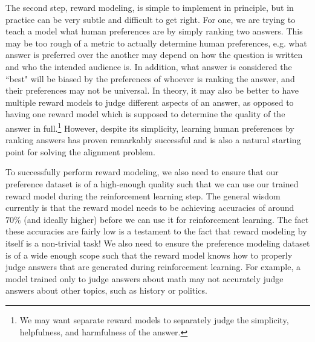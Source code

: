 \documentclass[11pt, oneside]{article}   	%
\begin{document}
The second step, reward modeling, is simple to implement in principle, but in practice can be very subtle and difficult to get right.
For one, we are trying to teach a model what human preferences are by simply ranking two answers.
This may be too rough of a metric to actually determine human preferences, e.g. what answer is preferred over the another may depend on how the question is written and who the intended audience is.
In addition, what answer is considered the ``best" will be biased by the preferences of whoever is ranking the answer, and their preferences may not be universal.
In theory, it may also be better to have multiple reward models to judge different aspects of an answer, as opposed to having one reward model which is supposed to determine the quality of the answer in full.\footnote{We may want separate reward models to separately judge the simplicity, helpfulness, and harmfulness of the answer.}
However, despite its simplicity, learning human preferences by ranking answers has proven remarkably successful and is also a natural starting point for solving the alignment problem.

To successfully perform reward modeling, we also need to ensure that our preference dataset is of a high-enough quality such that we can use our trained reward model during the reinforcement learning step.
The general wisdom currently is that the reward model needs to be achieving accuracies of around $70\%$ (and ideally higher) before we can use it for reinforcement learning.
The fact these accuracies are fairly low is a testament to the fact that reward modeling by itself is a non-trivial task!
We also need to ensure the preference modeling dataset is of a wide enough scope such that the reward model knows how to properly judge answers that are generated during reinforcement learning.
For example, a model trained only to judge answers about math may not accurately judge answers about other topics, such as history or politics.
\end{document}
